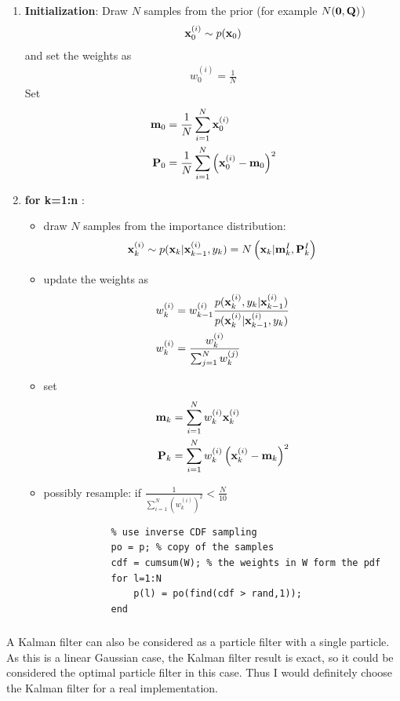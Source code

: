 \documentclass[a4paper,oneside,article]{memoir}
\begin{document}
\begin{enumerate}
 	\item {\bfseries Initialization}: Draw $N$ samples from the prior (for
  example $N(\mathbf{0},\mathbf{Q})$)
  	\begin{align}
		\mathbf{x}_0^{(i)}\sim p(\mathbf{x}_0)
	\end{align}
	and set the weights as
	\begin{align}
		w_0^{(i)}=\frac{1}{N}
	\end{align}
	Set
	\begin{align}
		\mathbf{m}_0&=\frac{1}{N}\sum_{i=1}^N \mathbf{x}_0^{(i)}\\
		\mathbf{P}_0&=\frac{1}{N}\sum_{i=1}^N \left(\mathbf{x}_0^{(i)}-\mathbf{m}_0\right)^2
	\end{align}
	\item {\bfseries\ttfamily for k=1:n} :
	\begin{itemize}
		\item draw $N$ samples from the importance distribution:
		\begin{align}
			\mathbf{x}_k^{(i)}\sim
			p(\mathbf{x}_k|\mathbf{x}_{k-1}^{(i)},y_{k})=N\left(\mathbf{x}_k|\mathbf{m}^I_k,\mathbf{P}^I_k\right)
		\end{align}
		\item update the weights as
		\begin{align}
			w_k^{(i)}&=w_{k-1}^{(i)}\frac{p(\mathbf{x}_k^{(i)},y_{k}|\mathbf{x}_{k-1}^{(i)})}{p(\mathbf{x}_k^{(i)}|\mathbf{x}_{k-1}^{(i)},y_{k})}\\
			w_k^{(i)}&=\frac{w_k^{(i)}}{\sum_{j=1}^N w_k^{(j)}}
		\end{align}
  		\item set
		\begin{align}
			\mathbf{m}_k&=\sum_{i=1}^N w_k^{(i)}\mathbf{x}_k^{(i)}\\
			\mathbf{P}_k&=\sum_{i=1}^N w_k^{(i)}\left(\mathbf{x}_k^{(i)}-\mathbf{m}_k\right)^2
		\end{align}
		\item possibly resample: {\ttfamily if} $\frac{1}{\sum_{i=1}^N \left(w_k^{(i)}\right)^2} < \frac{N}{10}$ 
		\begin{lstlisting}
			% use inverse CDF sampling
			po = p; % copy of the samples
			cdf = cumsum(W); % the weights in W form the pdf
			for l=1:N
			    p(l) = po(find(cdf > rand,1));
			end
		\end{lstlisting}
	\end{itemize}
	
	
\end{enumerate}

\subsubsection{}
A Kalman filter can also be considered as a particle filter with a single particle. As this
is a linear Gaussian case, the Kalman filter result is exact, so it could be considered
the optimal particle filter in this case. Thus I would definitely choose the Kalman filter
for a real implementation.
\end{document}
